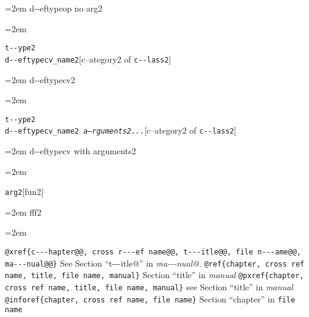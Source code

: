 \documentclass{book}
\begin{document}
%
\par\begingroup\obeylines\obeyspaces\frenchspacing\leftskip=2em\relax\parskip=0pt\relax\ttfamily{}%
d{-}{-}eftypeop no arg2
\endgroup{}%
\par\begingroup\obeylines\obeyspaces\frenchspacing\leftskip=2em\relax\parskip=0pt\relax\ttfamily{}%

\endgroup{}%
\noindent\texttt{t{-}{-}ype2\leavevmode{}\\d{-}{-}eftypecv\_name2}\hfill[c--ategory2 of \texttt{c{-}{-}lass2}]



%
\par\begingroup\obeylines\obeyspaces\frenchspacing\leftskip=2em\relax\parskip=0pt\relax\ttfamily{}%
d{-}{-}eftypecv2
\endgroup{}%
\par\begingroup\obeylines\obeyspaces\frenchspacing\leftskip=2em\relax\parskip=0pt\relax\ttfamily{}%

\endgroup{}%
\noindent\texttt{t{-}{-}ype2\leavevmode{}\\d{-}{-}eftypecv\_name2 \bgroup{}\normalfont{}\textsl{a--rguments2...}\egroup{}}\hfill[c--ategory2 of \texttt{c{-}{-}lass2}]



%
\par\begingroup\obeylines\obeyspaces\frenchspacing\leftskip=2em\relax\parskip=0pt\relax\ttfamily{}%
d{-}{-}eftypecv with arguments2
\endgroup{}%
\par\begingroup\obeylines\obeyspaces\frenchspacing\leftskip=2em\relax\parskip=0pt\relax\ttfamily{}%

\endgroup{}%
\noindent\texttt{arg2}\hfill[fun2]



%
\par\begingroup\obeylines\obeyspaces\frenchspacing\leftskip=2em\relax\parskip=0pt\relax\ttfamily{}%
fff2
\endgroup{}%
\par\begingroup\obeylines\obeyspaces\frenchspacing\leftskip=2em\relax\parskip=0pt\relax\ttfamily{}%


\texttt{@xref\{c{-}{-}{-}hapter@@, cross r{-}{-}{-}ef name@@, t{-}{-}{-}itle@@, file n{-}{-}{-}ame@@, ma{-}{-}{-}nual@@\}} See Section ``t{-}{-}{-}itle@'' in \textsl{ma{-}{-}{-}nual@}.
\texttt{@ref\{chapter, cross ref name, title, file name, manual\}} Section ``title'' in \textsl{manual}
\texttt{@pxref\{chapter, cross ref name, title, file name, manual\}} see Section ``title'' in \textsl{manual}
\texttt{@inforef\{chapter, cross ref name, file name\}} Section ``chapter'' in \texttt{file name}
\end{document}
